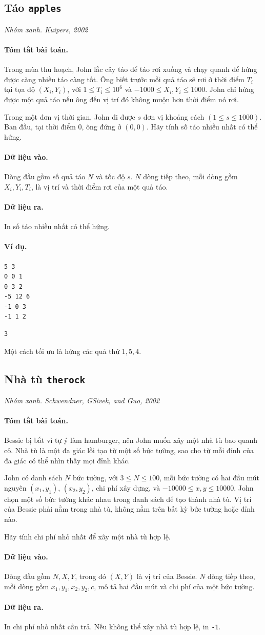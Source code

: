 \documentclass[11pt]{article}
\newcommand{\problem}[4]{%
  \subsection[#1 (#2)]{#1 \hfill {\normalsize\texttt{#2}}}%
  \noindent\textit{#3. #4}\par\smallskip
}
\newcommand{\iosec}[1]{\paragraph{#1}}
\begin{document}
\problem{Táo}{apples}{Nhóm xanh}{Kuipers, 2002}

\iosec{Tóm tắt bài toán.}
Trong mùa thu hoạch, John lắc cây táo để táo rơi xuống và chạy quanh để hứng
được càng nhiều táo càng tốt. Ông biết trước mỗi quả táo sẽ rơi ở thời điểm
\(T_i\) tại tọa độ \((X_i,Y_i)\), với \(1\le T_i\le 10^6\) và
\(-1000\le X_i,Y_i\le 1000\). John chỉ hứng được một quả táo nếu ông đến vị
trí đó không muộn hơn thời điểm nó rơi.

Trong một đơn vị thời gian, John đi được \(s\) đơn vị khoảng cách
\((1\le s\le 1000)\). Ban đầu, tại thời điểm \(0\), ông đứng ở \((0,0)\). Hãy
tính số táo nhiều nhất có thể hứng.

\iosec{Dữ liệu vào.}
Dòng đầu gồm số quả táo \(N\) và tốc độ \(s\). \(N\) dòng tiếp theo, mỗi dòng
gồm \(X_i,Y_i,T_i\), là vị trí và thời điểm rơi của một quả táo.

\iosec{Dữ liệu ra.}
In số táo nhiều nhất có thể hứng.

\iosec{Ví dụ.}
\begin{verbatim}
5 3
0 0 1
0 3 2
-5 12 6
-1 0 3
-1 1 2
\end{verbatim}

\begin{verbatim}
3
\end{verbatim}

Một cách tối ưu là hứng các quả thứ \(1,5,4\).

\problem{Nhà tù}{therock}{Nhóm xanh}{Schwendner, GSivek, and Guo, 2002}

\iosec{Tóm tắt bài toán.}
Bessie bị bắt vì tự ý làm hamburger, nên John muốn xây một nhà tù bao quanh
cô. Nhà tù là một đa giác lồi tạo từ một số bức tường, sao cho từ mỗi đỉnh của
đa giác có thể nhìn thấy mọi đỉnh khác.

John có danh sách \(N\) bức tường, với \(3\le N\le 100\), mỗi bức tường có hai
đầu mút nguyên \((x_1,y_1)\), \((x_2,y_2)\), chi phí xây dựng, và
\(-10000\le x,y\le 10000\). John chọn một số bức tường khác nhau trong danh
sách để tạo thành nhà tù. Vị trí của Bessie phải nằm trong nhà tù, không nằm
trên bất kỳ bức tường hoặc đỉnh nào.

Hãy tính chi phí nhỏ nhất để xây một nhà tù hợp lệ.

\iosec{Dữ liệu vào.}
Dòng đầu gồm \(N,X,Y\), trong đó \((X,Y)\) là vị trí của Bessie. \(N\) dòng
tiếp theo, mỗi dòng gồm \(x_1,y_1,x_2,y_2,c\), mô tả hai đầu mút và chi phí
của một bức tường.

\iosec{Dữ liệu ra.}
In chi phí nhỏ nhất cần trả. Nếu không thể xây nhà tù hợp lệ, in \texttt{-1}.
\end{document}
